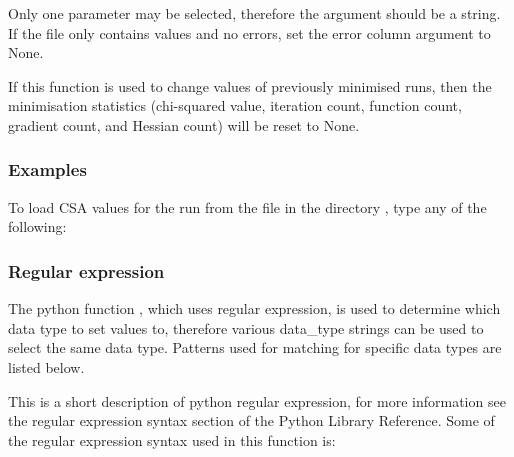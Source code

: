  Only one parameter may be selected, therefore the  argument should be a string.  If the file only contains values and no errors, set the error column argument to None. 
  

 If this function is used to change values of previously minimised runs, then the minimisation statistics (chi-squared value, iteration count, function count, gradient count, and Hessian count) will be reset to None. 
  

  
 \subsubsection{Examples} 

 To load CSA values for the run  from the file  in the directory , type any of the following: 
  




  
 \subsubsection{Regular expression} 

 The python function , which uses regular expression, is used to determine which data type to set values to, therefore various data\_type strings can be used to select the same data type.  Patterns used for matching for specific data types are listed below. 
  

 This is a short description of python regular expression, for more information see the regular expression syntax section of the Python Library Reference.  Some of the regular expression syntax used in this function is: 
  


